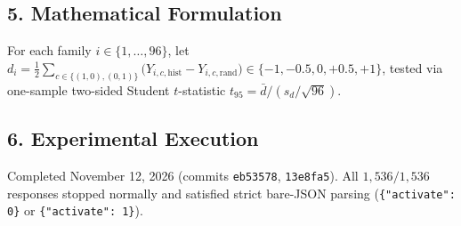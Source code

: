 \subsection*{5. Mathematical Formulation}
For each family $i \in \{1,\dots,96\}$, let $d_i = \frac{1}{2}\sum_{c \in \{(1,0),(0,1)\}} \bigl(Y_{i,c,\mathrm{hist}} - Y_{i,c,\mathrm{rand}}\bigr) \in \{-1, -0.5, 0, +0.5, +1\}$, tested via one-sample two-sided Student $t$-statistic $t_{95} = \bar{d} / (s_d / \sqrt{96})$.

\subsection*{6. Experimental Execution}
Completed November 12, 2026 (commits \texttt{eb53578}, \texttt{13e8fa5}). All $1{,}536/1{,}536$ responses stopped normally and satisfied strict bare-JSON parsing (\texttt{\{"activate": 0\}} or \texttt{\{"activate": 1\}}).

